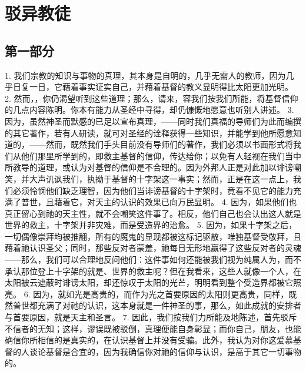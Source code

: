
\chapter{驳异教徒}


\par


\section{第一部分}

 1. 我们宗教的知识与事物的真理，其本身是自明的，几乎无需人的教师，因为几乎日复一日，它藉着事实证实自己，并藉着基督的教义显明得比太阳更加光明。 2. 然而，，你仍渴望听到这些道理；那么，请来，容我们按我们所能，将基督信仰的几点内容陈明。你本有能力从圣经中寻得，却仍慷慨地愿意也听别人讲述。 3. 因为，虽然神圣而默感的已足以宣布真理，——同时我们真福的导师们为此而编撰的其它著作，若有人研读，就可对圣经的诠释获得一些知识，并能学到他所愿意知道的，——然而，既然我们手头目前没有导师们的著作，我们必须以书面形式将我们从他们那里所学到的，即救主基督的信仰，传达给你；以免有人轻视在我们当中所教导的道理，或认为对基督的信仰是不合理的。因为外邦人正是对此加以诽谤嘲笑，并大声讥讽我们，执拗于基督的十字架这一事实；然而，正是在这一点上，我们必须怜悯他们缺乏理智，因为他们当诽谤基督的十字架时，竟看不见它的能力充满了普世，且藉着它，对天主的认识的效果已向万民显明。 4. 因为，如果他们也真正留心到祂的天主性，就不会嘲笑这件事了。相反，他们自己也会认出这人就是世界的救主，十字架并非灾难，而是受造界的治愈。 5. 因为，如果十字架之后，一切偶像崇拜均被推翻，所有的魔鬼的显现都被这标记驱散，唯独基督受敬拜，且藉着祂认识圣父；同时，那些反对者蒙羞，祂每日无形地赢得了这些反对者的灵魂——那么，我们可以合理地反问他们：这件事如何还能被我们视为纯属人为，而不承认那位登上十字架的就是、世界的救主呢？但在我看来，这些人就像一个人，在太阳被云遮蔽时诽谤太阳，却还惊叹于太阳的光芒，明明看到整个受造界都被它照亮。 6. 因为，就如光是高贵的，而作为光之首要原因的太阳则更高贵，同样，既然普世都充满了对祂的认识，这本身就是一件神圣的事，那么，如此成就的安排者与首要原因，就是天主和圣言。 7. 因此，我们按我们力所能及地陈述，首先驳斥不信者的无知；这样，谬误既被驳倒，真理便能自身彰显；而你自己，朋友，也能确信你所相信的是真实的，在认识基督上并没有受骗。此外，我认为对你这爱慕基督的人谈论基督是合宜的，因为我确信你对祂的信仰与认识，是高于其它一切事物的。\par

